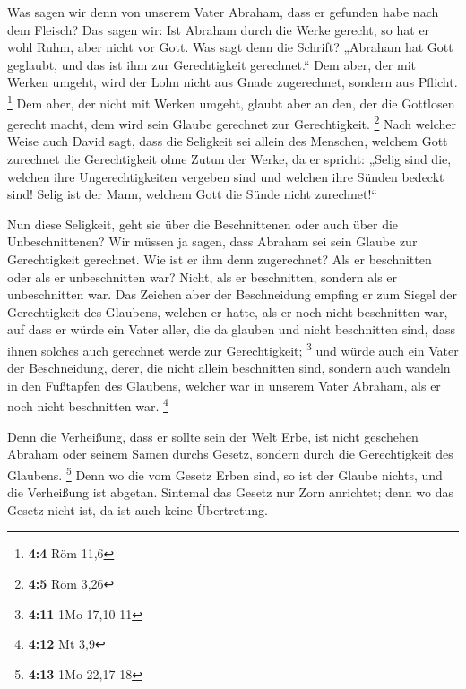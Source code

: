  Was sagen wir denn von unserem Vater Abraham, dass er
gefunden habe nach dem Fleisch?  Das sagen wir: Ist
Abraham durch die Werke gerecht, so hat er wohl Ruhm, aber nicht vor
Gott.  Was sagt denn die Schrift? „Abraham hat Gott
geglaubt, und das ist ihm zur Gerechtigkeit gerechnet.`` 
Dem aber, der mit Werken umgeht, wird der Lohn nicht aus Gnade
zugerechnet, sondern aus Pflicht. \footnote{\textbf{4:4} Röm 11,6}
 Dem aber, der nicht mit Werken umgeht, glaubt aber an
den, der die Gottlosen gerecht macht, dem wird sein Glaube gerechnet zur
Gerechtigkeit. \footnote{\textbf{4:5} Röm 3,26}  Nach
welcher Weise auch David sagt, dass die Seligkeit sei allein des
Menschen, welchem Gott zurechnet die Gerechtigkeit ohne Zutun der Werke,
da er spricht:  „Selig sind die, welchen ihre
Ungerechtigkeiten vergeben sind und welchen ihre Sünden bedeckt sind!
 Selig ist der Mann, welchem Gott die Sünde nicht
zurechnet!{}``

 Nun diese Seligkeit, geht sie über die Beschnittenen oder
auch über die Unbeschnittenen? Wir müssen ja sagen, dass Abraham sei
sein Glaube zur Gerechtigkeit gerechnet.  Wie ist er ihm
denn zugerechnet? Als er beschnitten oder als er unbeschnitten war?
Nicht, als er beschnitten, sondern als er unbeschnitten war.
 Das Zeichen aber der Beschneidung empfing er zum Siegel
der Gerechtigkeit des Glaubens, welchen er hatte, als er noch nicht
beschnitten war, auf dass er würde ein Vater aller, die da glauben und
nicht beschnitten sind, dass ihnen solches auch gerechnet werde zur
Gerechtigkeit; \footnote{\textbf{4:11} 1Mo 17,10-11}  und
würde auch ein Vater der Beschneidung, derer, die nicht allein
beschnitten sind, sondern auch wandeln in den Fußtapfen des Glaubens,
welcher war in unserem Vater Abraham, als er noch nicht beschnitten war.
\footnote{\textbf{4:12} Mt 3,9}

 Denn die Verheißung, dass er sollte sein der Welt Erbe,
ist nicht geschehen Abraham oder seinem Samen durchs Gesetz, sondern
durch die Gerechtigkeit des Glaubens. \footnote{\textbf{4:13} 1Mo
  22,17-18}  Denn wo die vom Gesetz Erben sind, so ist
der Glaube nichts, und die Verheißung ist abgetan. 
Sintemal das Gesetz nur Zorn anrichtet; denn wo das Gesetz nicht ist, da
ist auch keine Übertretung.

